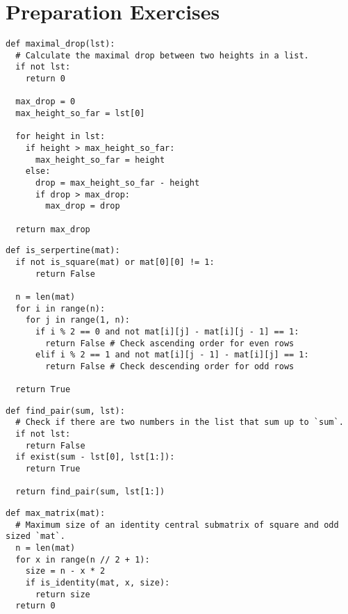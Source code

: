 \documentclass[11pt]{article}
\begin{document}
\section{Preparation Exercises}\label{sec:preparation-exercises}
\begin{lstlisting}
def maximal_drop(lst):
  # Calculate the maximal drop between two heights in a list.
  if not lst:
    return 0

  max_drop = 0
  max_height_so_far = lst[0]

  for height in lst:
    if height > max_height_so_far:
      max_height_so_far = height
    else:
      drop = max_height_so_far - height
      if drop > max_drop:
        max_drop = drop

  return max_drop
\end{lstlisting}

\begin{lstlisting}
def is_serpertine(mat):
  if not is_square(mat) or mat[0][0] != 1:
      return False

  n = len(mat)
  for i in range(n):
    for j in range(1, n):
      if i % 2 == 0 and not mat[i][j] - mat[i][j - 1] == 1: 
        return False # Check ascending order for even rows
      elif i % 2 == 1 and not mat[i][j - 1] - mat[i][j] == 1:  
        return False # Check descending order for odd rows

  return True
\end{lstlisting}

\vspace{0.25cm}

\begin{multicols}{2}
\begin{lstlisting}
def find_pair(sum, lst):
  # Check if there are two numbers in the list that sum up to `sum`.
  if not lst:
    return False
  if exist(sum - lst[0], lst[1:]):
    return True

  return find_pair(sum, lst[1:])
\end{lstlisting}
\begin{lstlisting}
def max_matrix(mat):
  # Maximum size of an identity central submatrix of square and odd sized `mat`.
  n = len(mat)
  for x in range(n // 2 + 1):
    size = n - x * 2
    if is_identity(mat, x, size):
      return size
  return 0
\end{lstlisting}
\end{multicols}

\vspace{-0.25cm}
\end{document}

